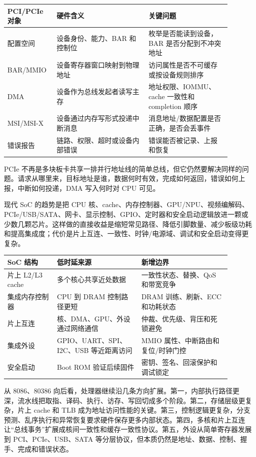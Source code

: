 \begin{longtable}{L{0.18\linewidth}L{0.38\linewidth}L{0.34\linewidth}}
\toprule
PCI/PCIe 对象 & 硬件含义 & 关键问题 \\
\midrule
配置空间 & 设备身份、能力、BAR 和控制位 & 枚举是否能读到设备，BAR 是否分配到不冲突地址 \\
BAR/MMIO & 设备寄存器窗口映射到物理地址 & 访问属性是否不可缓存或按设备规则排序 \\
DMA & 设备作为总线发起者读写主存 & 地址权限、IOMMU、cache 一致性和 completion 顺序 \\
MSI/MSI-X & 设备通过内存写形式投递中断消息 & 消息地址/数据配置是否正确，是否会丢事件 \\
错误报告 & 链路、权限、超时或设备内部错误 & 错误能否被记录、上报和恢复 \\
\bottomrule
\end{longtable}

PCIe 不再是多块板卡共享一排并行地址线的简单总线，但它仍然要解决同样的问题。请求从哪里来，目标地址是谁，数据何时有效，完成如何返回，错误如何上报，中断如何投递，DMA 写入何时对 CPU 可见。

现代 SoC 的趋势是把 CPU 核、cache、内存控制器、GPU/NPU、视频编解码、PCIe/USB/SATA、网卡、显示控制、GPIO、定时器和安全启动逻辑放进一颗或少数几颗芯片。这样做的直接收益是缩短常见路径、降低引脚数量、减少板级功耗和提高集成度；代价是片上互连、一致性、时钟/电源域、调试和安全启动变得更复杂。

\begin{longtable}{L{0.2\linewidth}L{0.34\linewidth}L{0.36\linewidth}}
\toprule
SoC 结构 & 低时延来源 & 新增边界 \\
\midrule
片上 L2/L3 cache & 多个核心共享近处数据 & 一致性状态、替换、QoS 和带宽竞争 \\
集成内存控制器 & CPU 到 DRAM 控制路径更短 & DRAM 训练、刷新、ECC 和功耗状态 \\
片上互连 & 核、DMA、GPU、外设通过网络通信 & 仲裁、优先级、背压和死锁避免 \\
集成外设 & GPIO、UART、SPI、I2C、USB 等近距离访问 & MMIO 属性、中断路由和复位/时钟门控 \\
安全启动 & Boot ROM 验证后续固件 & 密钥、签名、回滚保护和调试锁定 \\
\bottomrule
\end{longtable}

从 8086、80386 向后看，处理器继续沿几条方向扩展。第一，内部执行路径更深，流水线把取指、译码、执行、访存、写回切成多个阶段。第二，存储层级更复杂，片上 cache 和 TLB 成为地址访问性能的关键。第三，控制逻辑更复杂，分支预测、乱序执行和异常恢复要求硬件保存更多内部状态。第四，多核和片上互连让“总线事务”扩展成核间一致性和缓存一致性协议。第五，外设从简单寄存器发展到 PCI、PCIe、USB、SATA 等分层协议，但本质仍然是地址、数据、控制、握手、完成和错误状态。

